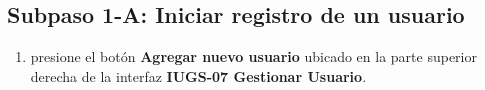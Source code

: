 \subsection{Subpaso 1-A: Iniciar registro de un usuario}
\begin{enumerate}
	\item presione el botón \textbf{Agregar nuevo usuario} ubicado en la parte 
		superior derecha de la interfaz
		\textbf{IUGS-07 Gestionar Usuario}.
\end{enumerate}

	